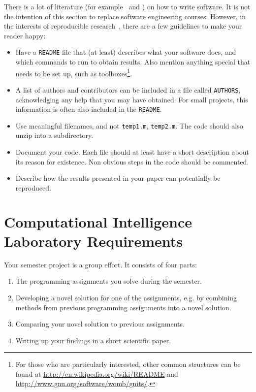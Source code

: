 \documentclass[10pt,conference,compsocconf]{IEEEtran}
\begin{document}
There is a lot of literature (for example~\cite{hunt99pragmatic} and
\cite{spolsky04software}) on how to write software. It is not the
intention of this section to replace software engineering
courses. However, in the interests of reproducible
research~\cite{schwab00}, there are a few guidelines to make your
reader happy:
\begin{itemize}
\item Have a \texttt{README} file that (at least) describes what your
  software does, and which commands to run to obtain results. Also
  mention anything special that needs to be set up, such as
  toolboxes\footnote{For those who are
  particularly interested, other common structures can be found at
  \url{http://en.wikipedia.org/wiki/README} and
  \url{http://www.gnu.org/software/womb/gnits/}.}.
\item A list of authors and contributors can be included in a file
  called \texttt{AUTHORS}, acknowledging any help that you may have
  obtained. For small projects, this information is often also
  included in the \texttt{README}.
\item Use meaningful filenames, and not \texttt{temp1.m},
  \texttt{temp2.m}. The code should also unzip into a subdirectory.
\item Document your code. Each file should at least have a short
  description about its reason for existence. Non obvious steps in the
  code should be commented.
\item Describe how the results presented in your paper can potentially
  be reproduced.
\end{itemize}


\section{Computational Intelligence Laboratory Requirements}
\label{sec:cil}

Your semester project is a group effort. It consists of four parts:
\begin{enumerate}
\item The programming assignments you solve during the semester.
\item Developing a novel solution for one of the assignments, e.g. by
  combining methods from previous programming assignments into a novel
  solution.
\item Comparing your novel solution to previous assignments.
\item Writing up your findings in a short scientific paper.
\end{enumerate}
\end{document}

